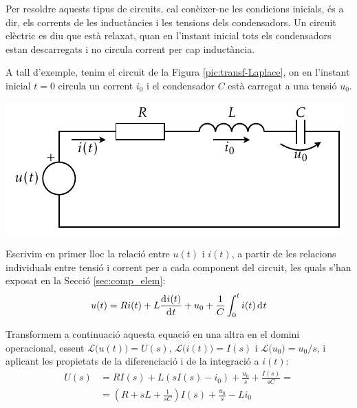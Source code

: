 Per resoldre aquests tipus de circuits, cal con\`{e}ixer-ne les
condicions inicials, \'{e}s a dir, els corrents de les induct\`{a}ncies i
les tensions dels condensadors. Un circuit el\`{e}ctric es diu que est\`{a}
relaxat, quan en l'instant inicial tots els condensadors estan
descarregats i no circula corrent per cap induct\`{a}ncia.

A tall d'exemple, tenim el circuit de la Figura
\vref{pic:transf-Laplace}, on en l'instant inicial $t=0$ circula un
corrent $i_0$ i el condensador $C$ est\`{a} carregat a una tensi\'{o} $u_0$.

\begin{center}
    \includegraphics{Imatges/Cap-Laplace-Circuit-RLC.pdf}
    \label{pic:transf-Laplace}
\end{center}

Escrivim en primer lloc  la relaci\'{o} entre $u(t)$ i $i(t)$, a partir
de les relacions individuals entre tensi\'{o} i corrent per a cada
component del circuit, les quals s'han exposat en la Secci\'{o}
\vref{sec:comp_elem}:
\begin{equation}
    u(t) = R i(t) + L \frac{\diff i(t)}{\diff t} + u_0 + \frac{1}{C}
    \int_0^t i(t) \diff t
\end{equation}

Transformem a continuaci\'{o} aquesta equaci\'{o} en una altra en el domini
operacional, essent $\mathcal{L}\bigl(u(t)\bigr) = U(s)$,
$\mathcal{L}\bigl(i(t)\bigr) = I(s)$ i $\mathcal{L}\bigl(u_0\bigr) =
u_0/s$, i aplicant les propietats de la diferenciaci\'{o} i de la
integraci\'{o} a $i(t)$:
\begin{equation}\begin{split}
    U(s) &= R I(s) + L(s I(s) -i_0) + \frac{u_0}{s} + \frac{I(s)}{s
    C} =\\[1ex]
    &= \left( R + s L +\frac{1}{s C}\right)I(s) + \frac{u_0}{s} - L i_0
\end{split}\end{equation}


